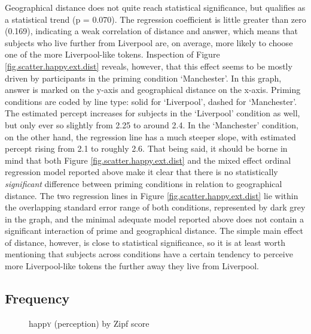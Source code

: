Geographical distance does not quite reach statistical significance, but qualifies as a statistical trend (p = 0.070).
The regression coefficient is little greater than zero (0.169), indicating a weak correlation of distance and answer, which means that subjects who live further from Liverpool are, on average, more likely to choose one of the more Liverpool-like tokens.
Inspection of Figure \ref{fig.scatter.happy.ext.dist} reveals, however, that this effect seems to be mostly driven by participants in the priming condition `Manchester'.
In this graph, answer is marked on the y-axis and geographical distance on the x-axis.
Priming conditions are coded by line type: solid for `Liverpool', dashed for `Manchester'.
The estimated percept increases for subjects in the `Liverpool' condition as well, but only ever so slightly from 2.25 to around 2.4.
In the `Manchester' condition, on the other hand, the regression line has a much steeper slope, with estimated percept rising from 2.1 to roughly 2.6.
That being said, it should be borne in mind that both Figure \ref{fig.scatter.happy.ext.dist} and the mixed effect ordinal regression model reported above make it clear that there is no statistically \emph{significant} difference between priming conditions in relation to geographical distance.
The two regression lines in Figure \ref{fig.scatter.happy.ext.dist} lie within the overlapping standard error range of both conditions, represented by dark grey in the graph, and the minimal adequate model reported above does not contain a significant interaction of prime and geographical distance.
The simple main effect of distance, however, is close to statistical significance, so it is at least worth mentioning that subjects across conditions have a certain tendency to perceive more Liverpool-like tokens the further away they live from Liverpool.

\subsection{Frequency}
\label{sec.perc_res.happy.frequency}

\begin{figure}[h]
	\centering
		\resizebox{.49\linewidth}{!}{} 
	\caption{happ\textsc{y} (perception) by Zipf score}
	\label{fig.scatter.happy.ext.zipf}
\end{figure}

